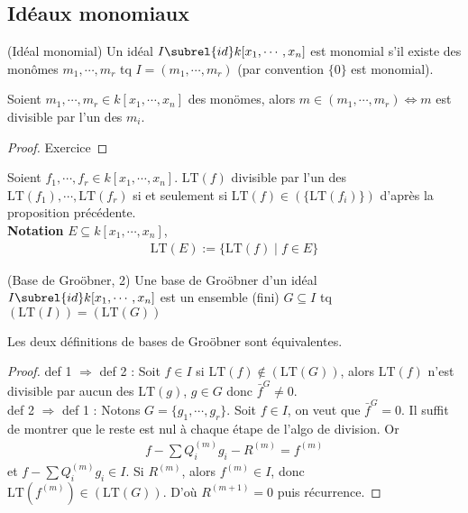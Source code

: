         \subsection{Idéaux monomiaux}
            \begin{defi} (Idéal monomial)
                Un idéal $I \subrel{id} k[x_1, \cdots, x_n]$ est monomial s'il existe des monômes $m_1, \cdots, m_r$ tq $I = (m_1, \cdots, m_r)$ (par convention $\{0\}$ est monomial).
            \end{defi}
            \begin{prop}
                Soient $m_1, \cdots, m_r \in k[x_1, \cdots, x_n]$ des monömes, alors $m \in (m_1, \cdots, m_r) \iff m$ est divisible par l'un des $m_i$.
            \end{prop}
            \begin{proof}
                Exercice
            \end{proof}
            Soient $f_1, \cdots, f_r \in k[x_1, \cdots, x_n]$. $\mathrm{LT}(f)$ divisible par l'un des $\mathrm{LT}(f_1), \cdots, \mathrm{LT}(f_r)$ si et seulement si $\mathrm{LT}(f) \in (\{\mathrm{LT}(f_i)\})$ d'après la proposition précédente. \\
            \textbf{Notation} $E \subseteq k[x_1, \cdots, x_n]$, 
            \begin{align*}
                \mathrm{LT}(E) := \{\mathrm{LT}(f) \mid f \in E\}
            \end{align*}
            \begin{defi} (Base de Groöbner, 2)
                Une base de Groöbner d'un idéal $I \subrel{id} k[x_1, \cdots, x_n]$ est un ensemble (fini) $G \subseteq I$ tq $(\mathrm{LT}(I)) = (\mathrm{LT}(G))$
            \end{defi}
            \begin{theo}
                Les deux définitions de bases de Groöbner sont équivalentes.
            \end{theo}
            \begin{proof}
                def 1 $\Rightarrow$ def 2 : Soit $f \in I$ si $\mathrm{LT}(f) \notin (\mathrm{LT}(G))$, alors $\mathrm{LT}(f)$ n'est divisible par aucun des $\mathrm{LT}(g)$, $g \in G$ donc $\bar f^G \neq 0$. \\
                def 2 $\Rightarrow$ def 1 : Notons $G = \{g_1, \cdots, g_r\}$. Soit $f \in I$, on veut que $\bar f^G = 0$. Il suffit de montrer que le reste est nul à chaque étape de l'algo de division. Or
                \begin{align*}
                    f - \sum Q_i^{(m)} g_i - R^{(m)} = f^{(m)}
                \end{align*}
                et $f - \sum Q_i^{(m)} g_i \in I$. Si $R^{(m)}$, alors $f^{(m)} \in I$, donc $\mathrm{LT}(f^{(m)}) \in (\mathrm{LT}(G))$. D'où $R^{(m+1)} = 0$ puis récurrence.
            \end{proof}
